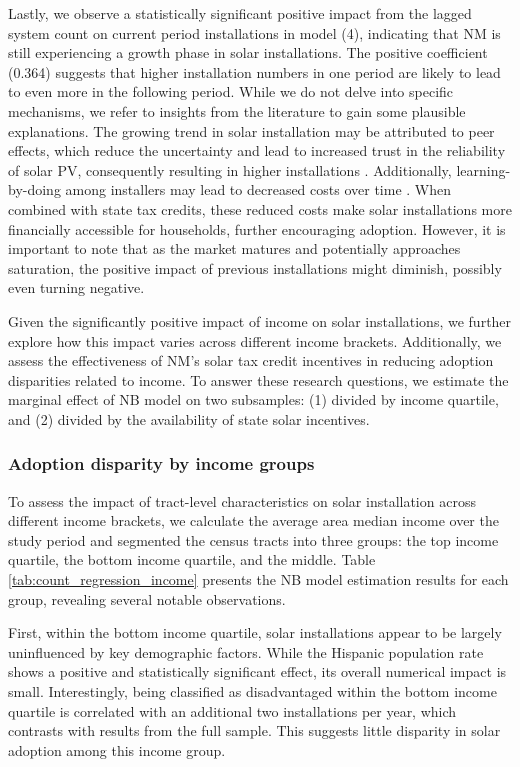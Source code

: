 \documentclass[11pt,twoside,letterpaper]{article}
\begin{document}
Lastly, we observe a statistically significant positive impact from the lagged system count on current period installations in model (4), indicating that NM is still experiencing a growth phase in solar installations. The positive coefficient (0.364) suggests that higher installation numbers in one period are likely to lead to even more in the following period. While we do not delve into specific mechanisms, we refer to insights from the literature to gain some plausible explanations. The growing trend in solar installation may be attributed to peer effects, which reduce the uncertainty and lead to increased trust in the reliability of solar PV, consequently resulting in higher installations \parencite{oshaughnessy_role_2023}.  Additionally, learning-by-doing among installers may lead to decreased costs over time \parencite{oshaughnessy_non-monotonic_2019}. When combined with state tax credits, these reduced costs make solar installations more financially accessible for households, further encouraging adoption. However, it is important to note that as the market matures and potentially approaches saturation, the positive impact of previous installations might diminish, possibly even turning negative.

Given the significantly positive impact of income on solar installations, we further explore how this impact varies across different income brackets. Additionally, we assess the effectiveness of NM's solar tax credit incentives in reducing adoption disparities related to income. To answer these research questions, we estimate the marginal effect of NB model on two subsamples: (1) divided by income quartile, and (2) divided by the availability of state solar incentives.

\subsubsection{Adoption disparity by income groups}

To assess the impact of tract-level characteristics on solar installation across different income brackets, we calculate the average area median income over the study period and segmented the census tracts into three groups: the top income quartile, the bottom income quartile, and the middle. Table \ref{tab:count_regression_income} presents the NB model estimation results for each group, revealing several notable observations.

First, within the bottom income quartile, solar installations appear to be largely uninfluenced by key demographic factors. While the Hispanic population rate shows a positive and statistically significant effect, its overall numerical impact is small. Interestingly, being classified as disadvantaged within the bottom income quartile is correlated with an additional two installations per year, which contrasts with results from the full sample. This suggests little disparity in solar adoption among this income group. 
\end{document}
